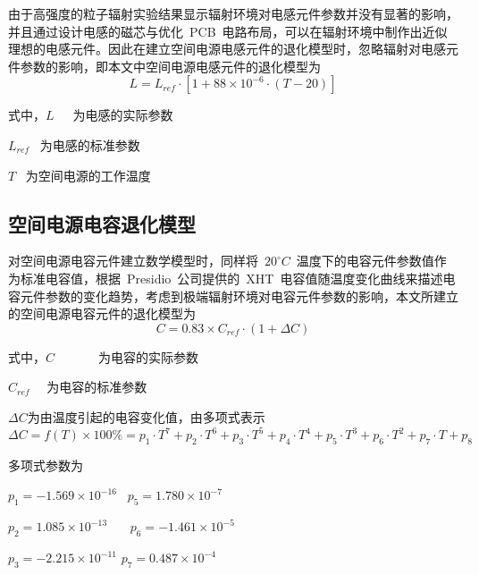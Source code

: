 由于高强度的粒子辐射实验结果显示辐射环境对电感元件参数并没有显著的影响，并且通过设计电感的磁芯与优化~PCB~电路布局，可以在辐射环境中制作出近似理想的电感元件。因此在建立空间电源电感元件的退化模型时，忽略辐射对电感元件参数的影响，即本文中空间电源电感元件的退化模型为
\begin{equation}\label{equ:chap2:Index12}
  L=L_{ref}\cdot \left[1+88\times 10^{-6}\cdot \left(T-20\right)\right]
\end{equation}

式中，$L$~~~\quad 为电感的实际参数

\hspace{1.3cm}$L_{ref}$  ~为电感的标准参数

\hspace{1.3cm}$T$ ~\quad 为空间电源的工作温度
\subsection{空间电源电容退化模型}
对空间电源电容元件建立数学模型时，同样将~$20^{\circ}C$~温度下的电容元件参数值作为标准电容值，根据~Presidio~公司提供的~XHT~电容值随温度变化曲线来描述电容元件参数的变化趋势，考虑到极端辐射环境对电容元件参数的影响，本文所建立的空间电源电容元件的退化模型为
\begin{equation}\label{equ:chap2:Index13}
  C=0.83\times C_{ref}\cdot\left(1+\Delta C\right)
\end{equation}

式中，$C$~~~~~~~为电容的实际参数

\hspace{1.3cm}$C_{ref}$ ~~为电容的标准参数

\hspace{1.3cm}$\Delta C$\quad 为由温度引起的电容变化值，由多项式表示
 \begin{equation}\label{equ:chap2:Index14}
  \Delta C=f\left(T\right)\times 100\%=p_1\cdot T^7+p_2\cdot T^6+p_3\cdot T^5+p_4\cdot T^4+p_5\cdot T^3+p_6\cdot T^2+p_7\cdot T+p_8
\end{equation}	

多项式参数为

\qquad \qquad $p_1=-1.569\times 10^{-16}$     \qquad \qquad ~$p_5= 1.780\times 10^{-7} $

\qquad \qquad  $p_2= 1.085\times 10^{-13}$    \qquad \qquad ~~~$p_6=-1.461\times 10^{-5}$

\qquad \qquad $p_3=-2.215\times 10^{-11}$     \qquad \qquad $p_7= 0.487\times 10^{-4}$

